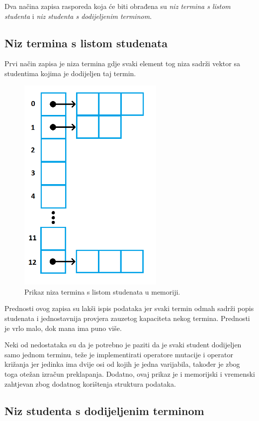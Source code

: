 \documentclass[times, utf8, zavrsni]{fer}
\begin{document}
Dva načina zapisa rasporeda koja će biti obrađena su \emph{niz termina s listom studenta} i \emph{niz studenta s dodijeljenim terminom}.

\subsection{Niz termina s listom studenata}

Prvi način zapisa je niza termina gdje svaki element tog niza sadrži vektor sa studentima kojima je dodijeljen taj termin.

\begin{figure}[htb]
\centering
\includegraphics[width=7cm]{images/prikaz_jednike_1.png}
\caption{Prikaz niza termina s listom studenata u memoriji.}
\label{fig:prikaz_jednike_1}
\end{figure}

Prednosti ovog zapisa su lakši ispis podataka jer svaki termin odmah sadrži popis studenata i jednostavnija provjera zauzetog kapaciteta nekog termina. Prednosti je vrlo malo, dok mana ima puno više.

Neki od nedostataka su da je potrebno je paziti da je svaki student dodijeljen samo jednom terminu, teže je implementirati operatore mutacije i operator križanja jer jedinka ima dvije osi od kojih je jedna varijabila, također je zbog toga otežan izračun preklapanja. Dodatno, ovaj prikaz je i memorijski i vremenski zahtjevan zbog dodatnog korištenja struktura podataka.

\subsection{Niz studenta s dodijeljenim terminom}
\end{document}
